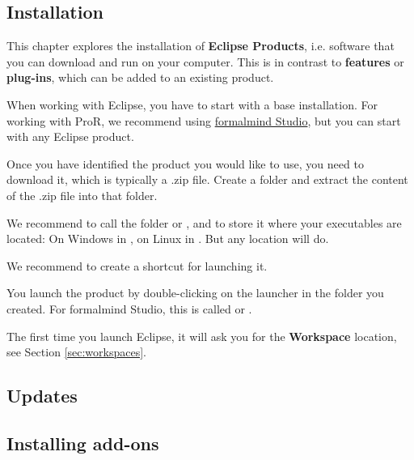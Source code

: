 \subsection{Installation}
\label{sec:installation}

This chapter explores the installation of \textbf{Eclipse Products}, i.e. software that you can download and run on your computer.  This is in contrast to \textbf{features} or \textbf{plug-ins}, which can be added to an existing product.

When working with Eclipse, you have to start with a base installation.  For working with ProR, we recommend using \href{http://formalmind.com/studio}{formalmind Studio}, but you can start with any Eclipse product.

Once you have identified the product you would like to use, you need to download it, which is typically a .zip file.  Create a folder and extract the content of the .zip file into that folder.

\begin{info}
We recommend to call the folder  or , and to store it where your executables are located: On Windows in , on Linux in .  But any location will do.

We recommend to create a shortcut for launching it.
\end{info}

You launch the product by double-clicking on the launcher in the folder you created.  For formalmind Studio, this is called  or .

The first time you launch Eclipse, it will ask you for the \textbf{Workspace} location, see Section \ref{sec:workspaces}.

\subsection{Updates}
\label{sec:update}

\subsection{Installing add-ons}
\label{sec:install-add-on}

